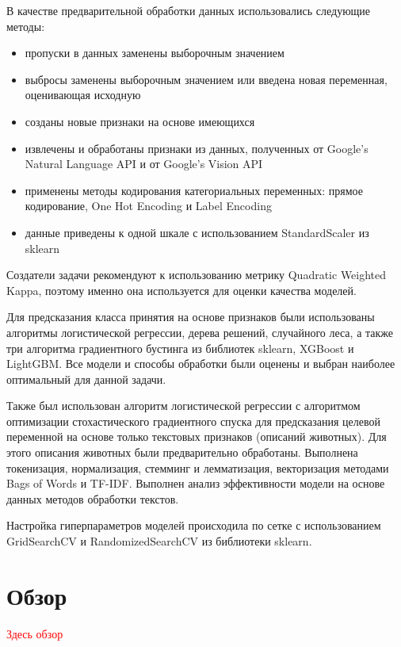 \documentclass[14pt]{mmcs_article}
\begin{document}
В качестве предварительной обработки данных использовались следующие методы: 
\begin{itemize}
	\item пропуски в данных заменены выборочным значением
	\item выбросы заменены выборочным значением или введена новая переменная, оценивающая исходную
	\item созданы новые признаки на основе имеющихся
	\item извлечены и обработаны признаки из данных, полученных от Google’s Natural Language API и от Google’s Vision API
	\item применены методы кодирования категориальных переменных: прямое кодирование, One Hot Encoding и Label Encoding
	\item данные приведены к одной шкале с использованием StandardScaler из sklearn
\end{itemize}

Создатели задачи рекомендуют к использованию метрику Quadratic Weighted Kappa, поэтому именно она используется для оценки качества моделей.

Для предсказания класса принятия на основе признаков были использованы алгоритмы логистической регрессии, дерева решений, случайного леса, а также три алгоритма градиентного бустинга из библиотек sklearn, XGBoost и LightGBM. Все модели и способы обработки были оценены и выбран наиболее оптимальный для данной задачи.

Также был использован алгоритм логистической регрессии с алгоритмом оптимизации стохастического градиентного спуска для предсказания целевой переменной на основе только текстовых признаков (описаний животных). Для этого описания животных были предварительно обработаны. Выполнена токенизация, нормализация, стемминг и лемматизация, векторизация методами Bags of Words и TF-IDF. Выполнен анализ эффективности модели на основе данных методов обработки текстов.

Настройка гиперпараметров моделей происходила по сетке с использованием GridSearchCV и RandomizedSearchCV из библиотеки sklearn.




\newpage
{}
\section*{Обзор}

\textcolor{red}{Здесь обзор}
\end{document}
